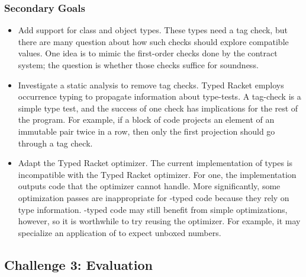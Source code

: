 \subsubsection{Secondary Goals}

\begin{itemize}
  \item
    Add support for class and object types.
    These types need a tag check, but there are many question about how such
     checks should explore compatible values.
    One idea is to mimic the first-order checks done by the contract system;
     the question is whether those checks suffice for soundness.
  \item
    Investigate a static analysis to remove tag checks.
    Typed Racket employs occurrence typing to propagate information about type-tests.
    A tag-check is a simple type test, and the success of one check has implications
     for the rest of the program.
    For example, if a block of code projects an element of an immutable pair twice in a row,
     then only the first projection should go through a tag check.
  \item
    Adapt the Typed Racket optimizer.
    The current implementation of \tshallow{} types is incompatible with the Typed
     Racket optimizer.
    For one, the implementation outputs code that the optimizer cannot handle.
    More significantly, some optimization passes are inappropriate for \tshallow{}-typed
     code because they rely on \tdeep{} type information.
    \tShallow{}-typed code may still benefit from simple optimizations, however,
     so it is worthwhile to try reusing the optimizer.
    For example, it may specialize an application of \racketcode{+} to expect unboxed numbers.
\end{itemize}


\subsection{Challenge 3: Evaluation}


